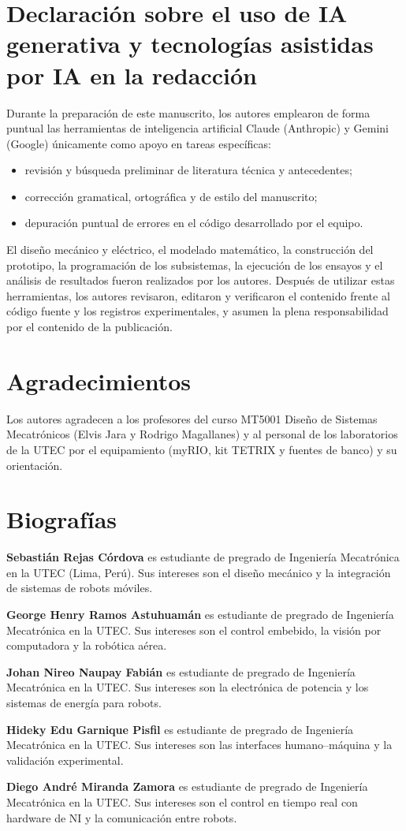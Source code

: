 \section*{Declaración sobre el uso de IA generativa y tecnologías asistidas por IA en la redacción}
Durante la preparación de este manuscrito, los autores emplearon de forma puntual las herramientas de inteligencia artificial Claude (Anthropic) y Gemini (Google) únicamente como apoyo en tareas específicas:
\begin{itemize}
  \item revisión y búsqueda preliminar de literatura técnica y antecedentes;
  \item corrección gramatical, ortográfica y de estilo del manuscrito;
  \item depuración puntual de errores en el código desarrollado por el equipo.
\end{itemize}
El diseño mecánico y eléctrico, el modelado matemático, la construcción del prototipo, la programación de los subsistemas, la ejecución de los ensayos y el análisis de resultados fueron realizados por los autores. Después de utilizar estas herramientas, los autores revisaron, editaron y verificaron el contenido frente al código fuente y los registros experimentales, y asumen la plena responsabilidad por el contenido de la publicación.

\section*{Agradecimientos}
Los autores agradecen a los profesores del curso MT5001 Diseño de Sistemas Mecatrónicos (Elvis Jara y Rodrigo Magallanes) y al personal de los laboratorios de la UTEC por el equipamiento (myRIO, kit TETRIX y fuentes de banco) y su orientación.

\section*{Biografías}
\noindent\textbf{Sebastián Rejas Córdova} es estudiante de pregrado de Ingeniería Mecatrónica en la UTEC (Lima, Perú). Sus intereses son el diseño mecánico y la integración de sistemas de robots móviles.

\noindent\textbf{George Henry Ramos Astuhuamán} es estudiante de pregrado de Ingeniería Mecatrónica en la UTEC. Sus intereses son el control embebido, la visión por computadora y la robótica aérea.

\noindent\textbf{Johan Nireo Naupay Fabián} es estudiante de pregrado de Ingeniería Mecatrónica en la UTEC. Sus intereses son la electrónica de potencia y los sistemas de energía para robots.

\noindent\textbf{Hideky Edu Garnique Pisfil} es estudiante de pregrado de Ingeniería Mecatrónica en la UTEC. Sus intereses son las interfaces humano--máquina y la validación experimental.

\noindent\textbf{Diego André Miranda Zamora} es estudiante de pregrado de Ingeniería Mecatrónica en la UTEC. Sus intereses son el control en tiempo real con hardware de NI y la comunicación entre robots.
